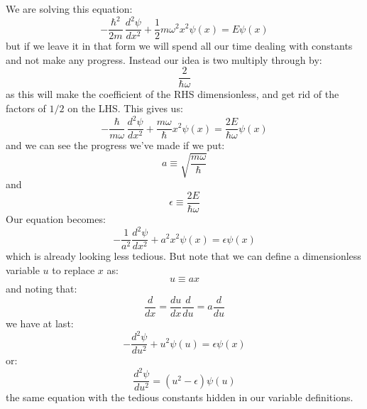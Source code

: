 \documentclass[12pt]{book}
\begin{document}
We are solving this equation:
\begin{equation*}
-\frac{\hbar^2}{2m}\,\frac{d^2 \psi}{d x^2} + \frac{1}{2} m \omega^2 x^2 \psi(x) = E \psi(x)
\end{equation*}
but if we leave it in that form we will spend all our time dealing with constants and not make any progress.  Instead our idea is two multiply through by:
$$\frac{2}{\hbar \omega}$$
as this will make the coefficient of the RHS dimensionless, and get rid of the factors of $1/2$ on the LHS.  This gives us:
\begin{equation*}
-\frac{\hbar}{m\omega}\,\frac{d^2 \psi}{d x^2} + \frac{m \omega}{\hbar} x^2 \psi(x) = \frac{2E}{\hbar\omega} \psi(x)
\end{equation*}
and we can see the progress we've made if we put:
$$a \equiv \sqrt{\frac{m \omega}{\hbar}}$$ 
and 
$$\epsilon \equiv \frac{2E}{\hbar\omega} $$
Our equation becomes:
\begin{equation*}
-\frac{1}{a^2}\frac{d^2 \psi}{d x^2} + a^2 x^2 \psi(x) = \epsilon \psi(x)
\end{equation*}
which is already looking less tedious.  But note that we can define a dimensionless variable $u$ to replace $x$ as:
$$u \equiv a x$$
and noting that:
$$\frac{d}{dx} = \frac{du}{dx}\frac{d}{du} = a \frac{d}{du}$$
we have at last:
\begin{equation*}
-\frac{d^2 \psi}{d u^2} + u^2 \psi(u) = \epsilon \psi(x)
\end{equation*}
or:
\begin{equation*}
\frac{d^2 \psi}{d u^2} =  (u^2 - \epsilon) \psi(u) 
\end{equation*}
the same equation with the tedious constants hidden in our variable definitions.
\end{document}
